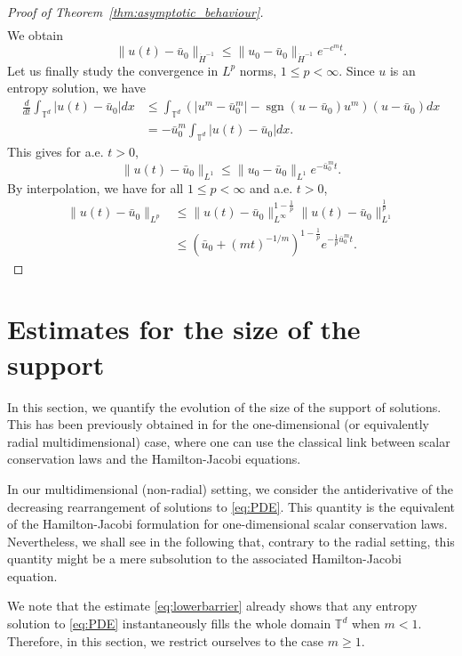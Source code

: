 \documentclass[11pt]{article}
\numberwithin{equation}{section} %
\DeclareMathOperator{\sgn}{sgn}
\newcommand{\T}{{\mathbb{T}}}
\begin{document}
\begin{proof}[Proof of Theorem~\ref{thm:asymptotic_behaviour}]
\begin{align*}
    \end{align*}
    We obtain
    \begin{equation*}
        \|u(t) -\bar{u}_{0}\|_{\dot H^{-1}} \le \|u_{0} - \bar{u}_{0}\|_{\dot H^{-1}} e^{-c^mt}.
    \end{equation*}
Let us finally study the convergence in $L^p$ norms, $1\le p<\infty$. Since $u$ is an entropy solution, we have 
\begin{align*}
    \frac{d}{dt}\int_{\T^d} |u(t)-\bar u_0| dx &\le \int_{\T^d} (|u^m-\bar u_0^m|-\sgn (u-\bar u_0) u^m) (u-\bar u_0) dx\\
    &= -\bar u_0^m \int_{\T^d} |u(t)-\bar u_0| dx.
\end{align*}
This gives for a.e. $t>0$,
\begin{equation*}
    \|u(t)-\bar u_0\|_{L^1}\le \|u_0-\bar u_0\|_{L^1} e^{-\bar u_0^m t}.
\end{equation*}
By interpolation, we have for all $1\le p<\infty$ and a.e. $t>0$,
\begin{align*}
   \|u(t)-\bar u_0\|_{L^p}&\le \|u(t)-\bar u_0\|_{L^\infty}^{1-\frac{1}{p}} \|u(t)-\bar u_0\|_{L^1}^\frac{1}{p} \\
    &\le (\bar u_0+ (mt)^{-1/m})^{1-\frac{1}{p}}  e^{-\frac{1}{p}\bar u_0^m t }.
\end{align*}
\end{proof}


\section{Estimates for the size of the support}\label{sec:support}


In this section, we quantify the evolution of the size of the support of solutions. This has been previously obtained in \cite{CGV2022vortex, CGV22FastRegularisation} for the one-dimensional (or equivalently radial multidimensional) case, where one can use the classical link between scalar conservation laws and the Hamilton-Jacobi equations. 

In our multidimensional (non-radial) setting, we consider the antiderivative of the decreasing rearrangement of solutions to \eqref{eq:PDE}. This quantity is the equivalent of the Hamilton-Jacobi formulation for one-dimensional scalar conservation laws. Nevertheless, we shall see in the following that, contrary to the radial setting, this quantity might be a mere subsolution to the associated Hamilton-Jacobi equation.

We note that the estimate \eqref{eq:lowerbarrier} already shows that any entropy solution to \eqref{eq:PDE} instantaneously fills the whole domain $\T^d$ when $m<1$. Therefore, in this section, we restrict ourselves to the case $m\ge 1$.
\end{document}
